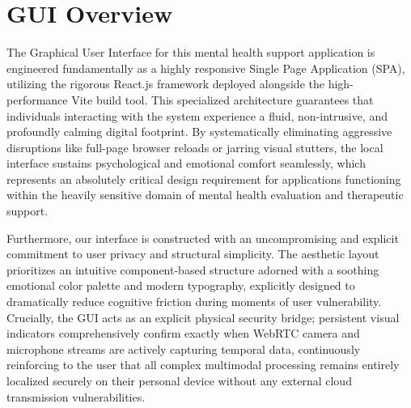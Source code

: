 \documentclass[11pt]{report}
\begin{document}
\section{GUI Overview}

The Graphical User Interface for this mental health support application is engineered fundamentally as a highly responsive Single Page Application (SPA), utilizing the rigorous React.js framework deployed alongside the high-performance Vite build tool. This specialized architecture guarantees that individuals interacting with the system experience a fluid, non-intrusive, and profoundly calming digital footprint. By systematically eliminating aggressive disruptions like full-page browser reloads or jarring visual stutters, the local interface sustains psychological and emotional comfort seamlessly, which represents an absolutely critical design requirement for applications functioning within the heavily sensitive domain of mental health evaluation and therapeutic support. 

Furthermore, our interface is constructed with an uncompromising and explicit commitment to user privacy and structural simplicity. The aesthetic layout prioritizes an intuitive component-based structure adorned with a soothing emotional color palette and modern typography, explicitly designed to dramatically reduce cognitive friction during moments of user vulnerability. Crucially, the GUI acts as an explicit physical security bridge; persistent visual indicators comprehensively confirm exactly when WebRTC camera and microphone streams are actively capturing temporal data, continuously reinforcing to the user that all complex multimodal processing remains entirely localized securely on their personal device without any external cloud transmission vulnerabilities.
\end{document}
